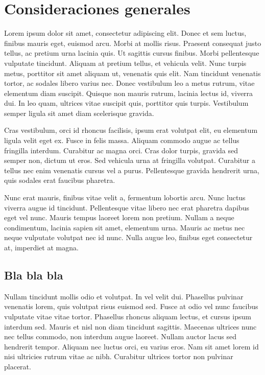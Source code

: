 \setcounter{section}{0}
\setcounter{subsection}{0}
\section*{Consideraciones generales}

Lorem ipsum dolor sit amet, consectetur adipiscing elit. Donec et sem luctus, finibus mauris eget, euismod arcu. Morbi at mollis risus. Praesent consequat justo tellus, ac pretium urna lacinia quis. Ut sagittis cursus finibus. Morbi pellentesque vulputate tincidunt. Aliquam at pretium tellus, et vehicula velit. Nunc turpis metus, porttitor sit amet aliquam ut, venenatis quis elit. Nam tincidunt venenatis tortor, ac sodales libero varius nec. Donec vestibulum leo a metus rutrum, vitae elementum diam suscipit. Quisque non mauris rutrum, lacinia lectus id, viverra dui. In leo quam, ultrices vitae suscipit quis, porttitor quis turpis. Vestibulum semper ligula sit amet diam scelerisque gravida.

Cras vestibulum, orci id rhoncus facilisis, ipsum erat volutpat elit, eu elementum ligula velit eget ex. Fusce in felis massa. Aliquam commodo augue ac tellus fringilla interdum. Curabitur ac magna orci. Cras dolor turpis, gravida sed semper non, dictum ut eros. Sed vehicula urna at fringilla volutpat. Curabitur a tellus nec enim venenatis cursus vel a purus. Pellentesque gravida hendrerit urna, quis sodales erat faucibus pharetra.

Nunc erat mauris, finibus vitae velit a, fermentum lobortis arcu. Nunc luctus viverra augue id tincidunt. Pellentesque vitae libero nec erat pharetra dapibus eget vel nunc. Mauris tempus laoreet lorem non pretium. Nullam a neque condimentum, lacinia sapien sit amet, elementum urna. Mauris ac metus nec neque vulputate volutpat nec id nunc. Nulla augue leo, finibus eget consectetur at, imperdiet at magna.

\subsection{Bla bla bla}
\label{subsec:blablabla}
Nullam tincidunt mollis odio et volutpat. In vel velit dui. Phasellus pulvinar venenatis lorem, quis volutpat risus euismod sed. Fusce at odio vel nunc faucibus vulputate vitae vitae tortor. Phasellus rhoncus aliquam lectus, et cursus ipsum interdum sed. Mauris et nisl non diam tincidunt sagittis. Maecenas ultrices nunc nec tellus commodo, non interdum augue laoreet. Nullam auctor lacus sed hendrerit tempor. Aliquam nec luctus orci, eu varius eros. Nam sit amet lorem id nisi ultricies rutrum vitae ac nibh. Curabitur ultrices tortor non pulvinar placerat.

